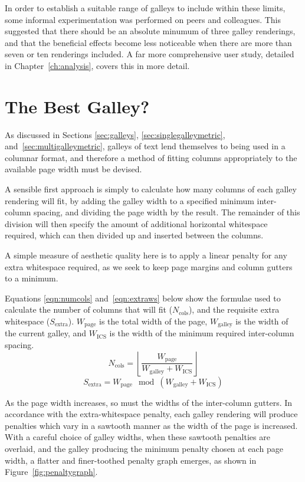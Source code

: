 In order to establish a suitable range of galleys to include within these limits, some informal experimentation was performed on peers and colleagues. This suggested that there should be an absolute minumum of three galley renderings, and that the beneficial effects become less noticeable when there are more than seven or ten renderings included. A far more comprehensive user study, detailed in Chapter~\ref{ch:analysis}, covers this in more detail.

\section{The Best Galley?}
\label{sec:layout}

As discussed in Sections \ref{sec:galleys}, \ref{sec:singlegalleymetric}, and~\ref{sec:multigalleymetric}, galleys of text lend themselves to being used in a columnar format, and therefore a method of fitting columns appropriately to the available page width must be devised.

A sensible first approach is simply to calculate how many columns of each galley rendering will fit, by adding the galley width to a specified minimum inter-column spacing, and dividing the page width by the result. The remainder of this division will then specify the amount of additional horizontal whitespace required, which can then divided up and inserted between the columns.

A simple measure of aesthetic quality here is to apply a linear penalty for any extra whitespace required, as we seek to keep page margins and column gutters to a minimum.

Equations \ref{eqn:numcols} and~\ref{eqn:extraws} below show the formulae used to calculate the number of columns that will fit ($N_\text{cols}$), and the requisite extra whitespace ($S_\text{extra}$). $W_\text{page}$ is the total width of the page, $W_\text{galley}$ is the width of the current galley, and $W_\text{ICS}$ is the width of the minimum required inter-column spacing.
\begin{equation}\label{eqn:numcols}
N_\text{cols}=\left\lfloor\frac{W_\text{page}}{W_\text{galley}+W_\text{ICS}}\right\rfloor
\end{equation}
\begin{equation}\label{eqn:extraws}
S_\text{extra}=W_\text{page}\!\!\mod \left(W_\text{galley}+W_\text{ICS}\right)
\end{equation}

As the page width increases, so must the widths of the inter-column gutters. In accordance with the extra-whitespace penalty, each galley rendering will produce penalties which vary in a sawtooth manner as the width of the page is increased. With a careful choice of galley widths, when these sawtooth penalties are overlaid, and the galley producing the minimum penalty chosen at each page width, a flatter and finer-toothed penalty graph emerges, as shown in Figure~\ref{fig:penaltygraph}.

